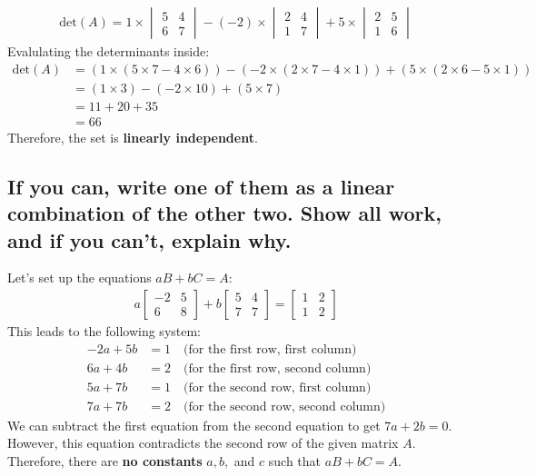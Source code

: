 \documentclass[
  letterpaper,
  DIV=11,
  numbers=noendperiod]{scrartcl}
\begin{document}
\begin{align*}
\text{det}(A) = 1 \times \begin{vmatrix} 5 & 4 \\ 6 & 7 \end{vmatrix} - (-2) \times \begin{vmatrix} 2 & 4 \\ 1 & 7 \end{vmatrix} + 5 \times \begin{vmatrix} 2 & 5 \\ 1 & 6 \end{vmatrix}
\end{align*} Evalulating the determinants inside: \begin{align*}
\text{det}(A) &= (1 \times (5 \times 7 - 4 \times 6)) - (-2 \times (2 \times 7 - 4 \times 1)) + (5 \times (2 \times 6 - 5 \times 1)) \\
&= (1 \times 3) - (-2 \times 10) + (5 \times 7) \\
&= 11 + 20 + 35 \\
&= 66
\end{align*} Therefore, the set is \textbf{linearly independent}.

\subsection{If you can, write one of them as a linear combination of the
other two. Show all work, and if you can't, explain
why.}\label{if-you-can-write-one-of-them-as-a-linear-combination-of-the-other-two.-show-all-work-and-if-you-cant-explain-why.}

Let's set up the equations \(aB + bC = A\): \begin{align*}
a \begin{bmatrix}-2&5\\6&8\end{bmatrix} + b \begin{bmatrix}5&4\\7&7\end{bmatrix} = \begin{bmatrix}1&2\\1&2\end{bmatrix}
\end{align*} This leads to the following system: \begin{align*}
-2a + 5b &= 1 \quad \text{(for the first row, first column)} \\
6a + 4b &= 2 \quad \text{(for the first row, second column)} \\
5a + 7b &= 1 \quad \text{(for the second row, first column)} \\
7a + 7b &= 2 \quad \text{(for the second row, second column)}
\end{align*} We can subtract the first equation from the second equation
to get \(7a+2b=0\). However, this equation contradicts the second row of
the given matrix \(A\). Therefore, there are \textbf{no constants}
\(a, b,\) and \(c\) such that \(aB + bC = A\).
\end{document}
